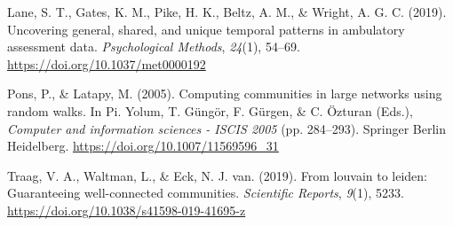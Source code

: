 \documentclass[
]{article}
\newlength{\cslhangindent}
\newenvironment{CSLReferences}[2] %
 {\begin{list}{}{%
  \setlength{\itemindent}{0pt}
  \setlength{\leftmargin}{0pt}
  \setlength{\parsep}{0pt}
  \ifodd #1
   \setlength{\leftmargin}{\cslhangindent}
   \setlength{\itemindent}{-1\cslhangindent}
  \fi
  \setlength{\itemsep}{#2\baselineskip}}}
 {\end{list}}
\begin{document}
\begin{CSLReferences}{1}{0}
Lane, S. T., Gates, K. M., Pike, H. K., Beltz, A. M., \& Wright, A. G.
C. (2019). Uncovering general, shared, and unique temporal patterns in
ambulatory assessment data. \emph{Psychological Methods}, \emph{24}(1),
54--69. \url{https://doi.org/10.1037/met0000192}

Pons, P., \& Latapy, M. (2005). Computing communities in large networks
using random walks. In Pi. Yolum, T. Güngör, F. Gürgen, \& C. Özturan
(Eds.), \emph{Computer and information sciences - ISCIS 2005} (pp.
284--293). Springer Berlin Heidelberg.
\url{https://doi.org/10.1007/11569596_31}

Traag, V. A., Waltman, L., \& Eck, N. J. van. (2019). From louvain to
leiden: Guaranteeing well-connected communities. \emph{Scientific
Reports}, \emph{9}(1), 5233.
\url{https://doi.org/10.1038/s41598-019-41695-z}

\end{CSLReferences}

\endgroup
\end{document}
